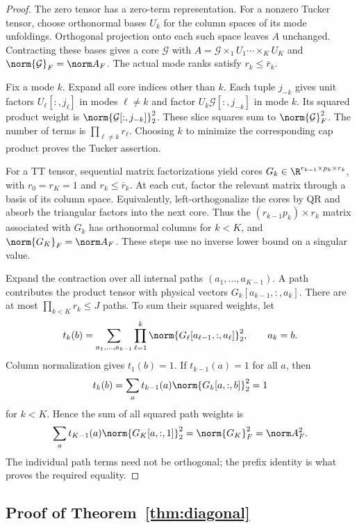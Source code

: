 \begin{proof}
The zero tensor has a zero-term representation. For a nonzero Tucker tensor, choose orthonormal bases $U_k$ for the column spaces of its mode unfoldings. Orthogonal projection onto each such space leaves $A$ unchanged. Contracting these bases gives a core $\mathcal G$ with $A=\mathcal G\times_1U_1\cdots\times_KU_K$ and $\norm{\mathcal G}_F=\norm A_F$. The actual mode ranks satisfy $r_k\le\bar r_k$.

Fix a mode $k$. Expand all core indices other than $k$. Each tuple $j_{-k}$ gives unit factors $U_\ell[:,j_\ell]$ in modes $\ell\ne k$ and factor $U_k\mathcal G[:,j_{-k}]$ in mode $k$. Its squared product weight is $\norm{\mathcal G[:,j_{-k}]}_2^2$. These slice squares sum to $\norm{\mathcal G}_F^2$. The number of terms is $\prod_{\ell\ne k}r_\ell$. Choosing $k$ to minimize the corresponding cap product proves the Tucker assertion.

For a TT tensor, sequential matrix factorizations yield cores $G_k\in\R^{r_{k-1}\times p_k\times r_k}$, with $r_0=r_K=1$ and $r_k\le\bar r_k$. At each cut, factor the relevant matrix through a basis of its column space. Equivalently, left-orthogonalize the cores by QR and absorb the triangular factors into the next core. Thus the $(r_{k-1}p_k)\times r_k$ matrix associated with $G_k$ has orthonormal columns for $k<K$, and $\norm{G_K}_F=\norm A_F$. These steps use no inverse lower bound on a singular value.

Expand the contraction over all internal paths $(a_1,\ldots,a_{K-1})$. A path contributes the product tensor with physical vectors $G_k[a_{k-1},:,a_k]$. There are at most $\prod_{k<K}r_k\le J$ paths. To sum their squared weights, let
\[
 t_k(b)=\sum_{a_1,\ldots,a_{k-1}}
 \prod_{\ell=1}^k\norm{G_\ell[a_{\ell-1},:,a_\ell]}_2^2,
 \qquad a_k=b.
\]
Column normalization gives $t_1(b)=1$. If $t_{k-1}(a)=1$ for all $a$, then
\[
 t_k(b)=\sum_a t_{k-1}(a)\norm{G_k[a,:,b]}_2^2=1
\]
for $k<K$. Hence the sum of all squared path weights is
\[
 \sum_a t_{K-1}(a)\norm{G_K[a,:,1]}_2^2=\norm{G_K}_F^2=\norm A_F^2.
\]
The individual path terms need not be orthogonal; the prefix identity is what proves the required equality.
\end{proof}

\subsection{Proof of Theorem~\ref{thm:diagonal}}

